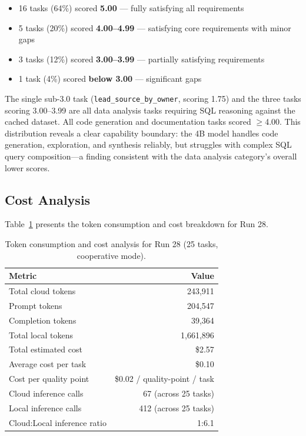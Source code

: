 \documentclass{article}
\begin{document}
\begin{itemize}[leftmargin=*]
\item 16 tasks (64\%) scored \textbf{5.00} --- fully satisfying all requirements
\item 5 tasks (20\%) scored \textbf{4.00--4.99} --- satisfying core requirements with minor gaps
\item 3 tasks (12\%) scored \textbf{3.00--3.99} --- partially satisfying requirements
\item 1 task (4\%) scored \textbf{below 3.00} --- significant gaps
\end{itemize}

The single sub-3.0 task (\texttt{lead\_source\_by\_owner}, scoring 1.75) and the three tasks scoring 3.00--3.99 are all data analysis tasks requiring SQL reasoning against the cached dataset.
All code generation and documentation tasks scored $\geq$4.00.
This distribution reveals a clear capability boundary: the 4B model handles code generation, exploration, and synthesis reliably, but struggles with complex SQL query composition---a finding consistent with the data analysis category's overall lower scores.

\subsection{Cost Analysis}
\label{sec:eval_cost}

Table~\ref{tab:cost_analysis} presents the token consumption and cost breakdown for Run 28.

\begin{table}[h]
\centering
\caption{Token consumption and cost analysis for Run 28 (25 tasks, cooperative mode).}
\label{tab:cost_analysis}
\small
\begin{tabular}{@{}lr@{}}
\toprule
\textbf{Metric} & \textbf{Value} \\
\midrule
Total cloud tokens & 243,911 \\
\quad Prompt tokens & 204,547 \\
\quad Completion tokens & 39,364 \\
Total local tokens & 1,661,896 \\
Total estimated cost & \$2.57 \\
Average cost per task & \$0.10 \\
Cost per quality point & \$0.02 / quality-point / task \\
\midrule
Cloud inference calls & 67 (across 25 tasks) \\
Local inference calls & 412 (across 25 tasks) \\
Cloud:Local inference ratio & 1:6.1 \\
\bottomrule
\end{tabular}
\end{table}
\end{document}
